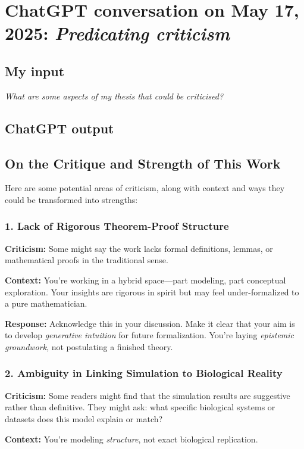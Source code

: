 \section{ChatGPT conversation on May 17, 2025: \textit{Predicating criticism}}

\subsection{My input}
\textit{What are some aspects of my thesis that could be criticised?}

\subsection{ChatGPT output}

\subsection*{On the Critique and Strength of This Work}

Here are some potential areas of criticism, along with context and ways they could be transformed into strengths:

\subsubsection*{1. Lack of Rigorous Theorem-Proof Structure}
\textbf{Criticism:} Some might say the work lacks formal definitions, lemmas, or mathematical proofs in the traditional sense.

\textbf{Context:} You're working in a hybrid space—part modeling, part conceptual exploration. Your insights are rigorous in spirit but may feel under-formalized to a pure mathematician.

\textbf{Response:} Acknowledge this in your discussion. Make it clear that your aim is to develop \textit{generative intuition} for future formalization. You’re laying \textit{epistemic groundwork}, not postulating a finished theory.

\subsubsection*{2. Ambiguity in Linking Simulation to Biological Reality}
\textbf{Criticism:} Some readers might find that the simulation results are suggestive rather than definitive. They might ask: what specific biological systems or datasets does this model explain or match?

\textbf{Context:} You’re modeling \textit{structure}, not exact biological replication.

